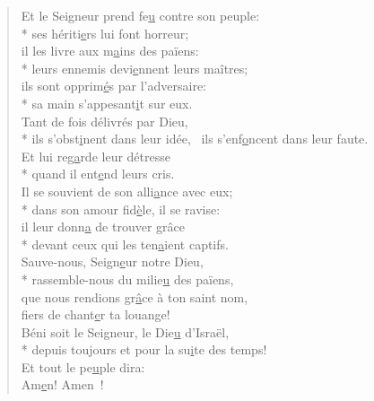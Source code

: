 \begin{verse}
Et le Seigneur prend fe\underline{u} contre son peuple: \\*
ses hériti\underline{e}rs lui font horreur; \\
il les livre aux m\underline{a}ins des païens: \\*
leurs ennemis devi\underline{e}nnent leurs maîtres; \\
ils sont opprim\underline{é}s par l’adversaire: \\*
sa main s’appesant\underline{i}t sur eux. \\

Tant de fois délivrés par Dieu, \\*
ils s’obst\underline{i}nent dans leur idée,~\psalmstar
ils s’enf\underline{o}ncent dans leur faute. \\
Et lui reg\underline{a}rde leur détresse \\*
quand il ent\underline{e}nd leurs cris. \\

Il se souvient de son alli\underline{a}nce avec eux; \\*
dans son amour fid\underline{è}le, il se ravise: \\
il leur donn\underline{a} de trouver grâce \\*
devant ceux qui les ten\underline{a}ient captifs. \\

Sauve-nous, Seign\underline{e}ur notre Dieu, \\*
rassemble-nous du milie\underline{u} des païens, \\
que nous rendions gr\underline{â}ce à ton saint nom, \\
fiers de chant\underline{e}r ta louange! \\

Béni soit le Seigneur, le Die\underline{u} d’Israël, \\*
depuis toujours et pour la su\underline{i}te des temps! \\
Et tout le pe\underline{u}ple dira: \\
Am\underline{e}n! Amen ! \\
\end{verse}

